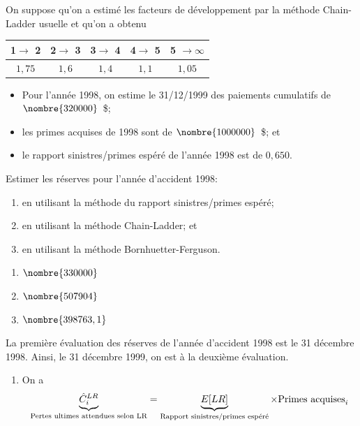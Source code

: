 \begin{exercice}
  On suppose qu'on a estimé les facteurs de développement par la
  méthode Chain-Ladder usuelle et qu'on a obtenu
  \begin{center}
    \begin{tabular}{|c c c c c|}\hline
      1$\rightarrow$ 2 &  2$\rightarrow$ 3 &  3$\rightarrow$ 4 &  4$\rightarrow$ 5  &5 $\rightarrow  \infty$  \\ \hline
      $1,75$ & $1,6$ & $1,4$ & $1,1$ & $1,05$ \\ \hline
    \end{tabular}
  \end{center}
  \begin{itemize}
  \item Pour l'année 1998, on estime le 31/12/1999 des paiements
    cumulatifs de $\nombre{320000}$~\$;
  \item les primes acquises de 1998 sont de $\nombre{1000000}$~\$; et
  \item le rapport sinistres/primes espéré de l'année 1998 est de
    $0,650$.
  \end{itemize}
  Estimer les réserves pour l'année d'accident 1998:
  \begin{enumerate}
  \item en utilisant la méthode du rapport sinistres/primes espéré;
  \item en utilisant la méthode Chain-Ladder; et
  \item en utilisant la méthode Bornhuetter-Ferguson.
  \end{enumerate}
  \begin{rep}
    \begin{enumerate}
    \item $\nombre{330000}$
    \item $\nombre{507904}$
    \item $\nombre{398763,1}$
    \end{enumerate}
  \end{rep}
  \begin{sol}
    La première évaluation des réserves de l'année d'accident 1998 est
    le 31 décembre 1998. Ainsi, le 31 décembre 1999, on est à la
    deuxième évaluation.
    \begin{enumerate}
    \item On a
      \begin{align*}
        \underbrace{\hat{C}_{i}^{LR}}_{\text{Pertes ultimes attendues selon LR}} &=
                                                                                   \underbrace{\Esp{LR}}_{\text{Rapport sinistres/primes espéré}} \times \text{Primes acquises}_i\\

\end{align*}
\end{enumerate}
\end{sol}
\end{exercice}
